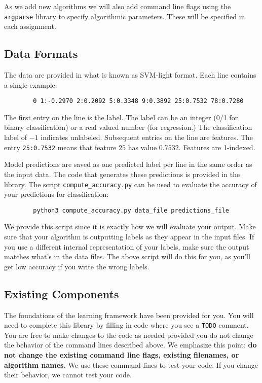 \documentclass[11pt]{article}
\begin{document}
	As we add new algorithms we will also add command line flags using the {\tt argparse} library to specify algorithmic parameters. These will be specified in each assignment.
	
	\subsection{Data Formats}
	The data are provided in what is known as SVM-light format. Each line contains a single example:
	\begin{footnotesize}
		\begin{verbatim}
		0 1:-0.2970 2:0.2092 5:0.3348 9:0.3892 25:0.7532 78:0.7280
		\end{verbatim}
	\end{footnotesize}
	The first entry on the line is the label. The label can be an integer (0/1 for binary classification) or a real valued number (for regression.) The classification label of $-1$ indicates unlabeled. Subsequent entries on the line are features. The entry {\tt 25:0.7532} means that feature $25$ has value $0.7532$. Features are 1-indexed.
	
	Model predictions are saved as one predicted label per line in the same order as the input data. The code that generates these predictions is provided in the library. The script {\tt compute\_accuracy.py} can be used to evaluate the accuracy of your predictions for classification:
	\begin{footnotesize}
		\begin{verbatim}
		python3 compute_accuracy.py data_file predictions_file
		\end{verbatim}
	\end{footnotesize}
	
	We provide this script since it is exactly how we will evaluate your output. Make sure that your algorithm is outputting labels as they appear in the input files. If you use a different internal representation of your labels, make sure the output matches what's in the data files. The above script will do this for you, as you'll get low accuracy if you write the wrong labels.
	
	\subsection{Existing Components}
	The foundations of the learning framework have been provided for you. You will need to complete this library by filling in code where you see a {\tt TODO} comment. You are free to make changes to the code as needed provided you do not change the behavior of the command lines described above. We emphasize this point: \textbf{do not change the existing command line flags, existing filenames, or algorithm names.} We use these command lines to test your code. If you change their behavior, we cannot test your code.
	
\end{document}
